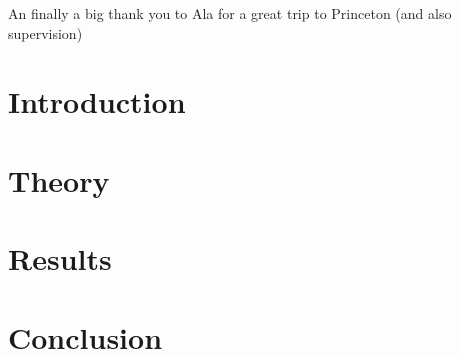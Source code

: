 \documentclass[12pt, oneside]{book}
\newcommand{\nocontentsline}[3]{}
\let\origcontentsline\addcontentsline
\newcommand\stoptoc{\let\addcontentsline\nocontentsline}
\newcommand\resumetoc{\let\addcontentsline\origcontentsline}
\renewcommand{\headrulewidth}{0pt}
\newcommand\mymainpagestyle{%
\fancyhf{}      
\fancyhead[L]{\nouppercase{\footnotesize{\chaptername~ \thechapter~ |~ \leftmark}} \renewcommand{\headrulewidth}{0.4pt} \headrule \renewcommand{\headrulewidth}{0pt}}
\setlength{\headheight}{25pt}
\fancyfoot[C]{\thepage}
}
\begin{document}
An finally a big thank you to Ala for a great trip to Princeton (and also supervision) 

\newpage
\tableofcontents
\newpage


\mainmatter 
\mymainpagestyle{} %

\chapter{Introduction}
\label{chap:intro}



\chapter{Theory}
\label{chap:theo}



\chapter{Results}
\label{chap:res}



\chapter{Conclusion}
\label{chap:con}


% 








\appendix
\renewcommand{\thesection}{A\arabic{section}}

\stoptoc



\resumetoc
\end{document}

